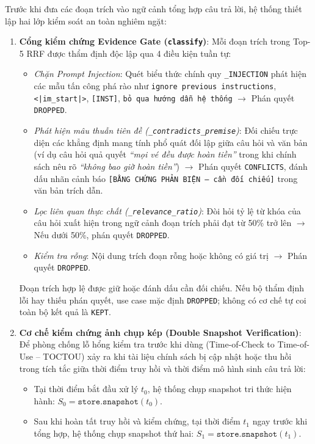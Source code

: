 Trước khi đưa các đoạn trích vào ngữ cảnh tổng hợp câu trả lời, hệ thống thiết lập hai lớp kiểm soát an toàn nghiêm ngặt:
\begin{enumerate}[nosep]
  \item \textbf{Cổng kiểm chứng Evidence Gate (\texttt{classify})}: Mỗi đoạn trích trong Top-5 RRF được thẩm định độc lập qua 4 điều kiện tuần tự:
  \begin{itemize}[nosep]
    \item \textit{Chặn Prompt Injection}: Quét biểu thức chính quy \texttt{\_INJECTION} phát hiện các mẫu tấn công phá rào như \texttt{ignore previous instructions}, \texttt{<|im\_start|>}, \texttt{[INST]}, \texttt{bỏ qua hướng dẫn hệ thống} $\rightarrow$ Phán quyết \texttt{DROPPED}.
    \item \textit{Phát hiện mâu thuẫn tiên đề (\texttt{\_contradicts\_premise})}: Đối chiếu trực diện các khẳng định mang tính phổ quát đối lập giữa câu hỏi và văn bản (ví dụ câu hỏi quả quyết \textit{``mọi vé đều được hoàn tiền''} trong khi chính sách nêu rõ \textit{``không bao giờ hoàn tiền''}) $\rightarrow$ Phán quyết \texttt{CONFLICTS}, đánh dấu nhãn cảnh báo \texttt{[BẰNG CHỨNG PHẢN BIỆN — cần đối chiếu]} trong văn bản trích dẫn.
    \item \textit{Lọc liên quan thực chất (\texttt{\_relevance\_ratio})}: Đòi hỏi tỷ lệ từ khóa của câu hỏi xuất hiện trong ngữ cảnh đoạn trích phải đạt từ 50\% trở lên $\rightarrow$ Nếu dưới 50\%, phán quyết \texttt{DROPPED}.
    \item \textit{Kiểm tra rỗng}: Nội dung trích đoạn rỗng hoặc không có giá trị $\rightarrow$ Phán quyết \texttt{DROPPED}.
  \end{itemize}
  Đoạn trích hợp lệ được giữ hoặc đánh dấu cần đối chiếu. Nếu bộ thẩm định lỗi hay thiếu phán quyết, use case mặc định \texttt{DROPPED}; không có cơ chế tự coi toàn bộ kết quả là \texttt{KEPT}.
  \item \textbf{Cơ chế kiểm chứng ảnh chụp kép (Double Snapshot Verification)}:
  Để phòng chống lỗ hổng kiểm tra trước khi dùng (Time-of-Check to Time-of-Use -- TOCTOU) xảy ra khi tài liệu chính sách bị cập nhật hoặc thu hồi trong tích tắc giữa thời điểm truy hồi và thời điểm mô hình sinh câu trả lời:
  \begin{itemize}[nosep]
    \item Tại thời điểm bắt đầu xử lý $t_0$, hệ thống chụp snapshot tri thức hiện hành: $S_0 = \texttt{store.snapshot}(t_0)$.
    \item Sau khi hoàn tất truy hồi và kiểm chứng, tại thời điểm $t_1$ ngay trước khi tổng hợp, hệ thống chụp snapshot thứ hai: $S_1 = \texttt{store.snapshot}(t_1)$.

\end{itemize}
\end{enumerate}
